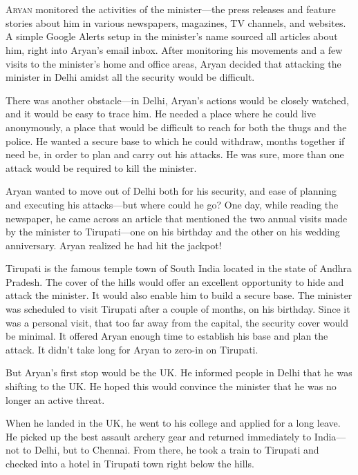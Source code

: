 \chapter{}

\lettrine{A}{ryan} monitored the activities of the minister—the press releases and feature
stories about him in various newspapers, magazines, TV channels, and websites. A simple
Google Alerts setup in the minister's name sourced all articles about him,
right into Aryan's email inbox. After monitoring his movements and a few
visits to the minister's home and office areas, Aryan decided that attacking the
minister in Delhi amidst all the security would be difficult.

There was another obstacle—in Delhi, Aryan's actions would be closely watched,
and it would be easy to trace him. He needed a place where he could live
anonymously, a place that would be difficult to reach for both the thugs and the
police. He wanted a secure base to which he could withdraw, months together if
need be, in order to plan and carry out his attacks. He was sure, more than
one attack would be required to kill the minister.

Aryan wanted to move out of Delhi both for his security, and ease of planning
and executing his attacks—but where could he go? One day, while reading the
newspaper, he came across an article that mentioned the two annual visits made
by the minister to Tirupati—one on his birthday and the other on his wedding
anniversary. Aryan realized he had hit the jackpot!

Tirupati is the famous temple town of South India located in the state of Andhra
Pradesh. The cover of the hills would offer an excellent opportunity to hide and
attack the minister. It would also enable him to build a secure base. The
minister was scheduled to visit Tirupati after a couple of months, on his
birthday. Since it was a personal visit, that too far away from the capital, the
security cover would be minimal. It offered Aryan enough time to establish his
base and plan the attack. It didn't take long for Aryan to zero-in on Tirupati.

But Aryan's first stop would be the UK.  He informed people in Delhi that he was
shifting to the UK. He hoped this would convince the minister that he was no
longer an active threat.

When he landed in the UK, he went to his college and applied for a long leave.
He picked up the best assault archery gear and returned immediately to India—not
to Delhi, but to Chennai. From there, he took a train to Tirupati and checked into a hotel
in Tirupati town right below the hills.